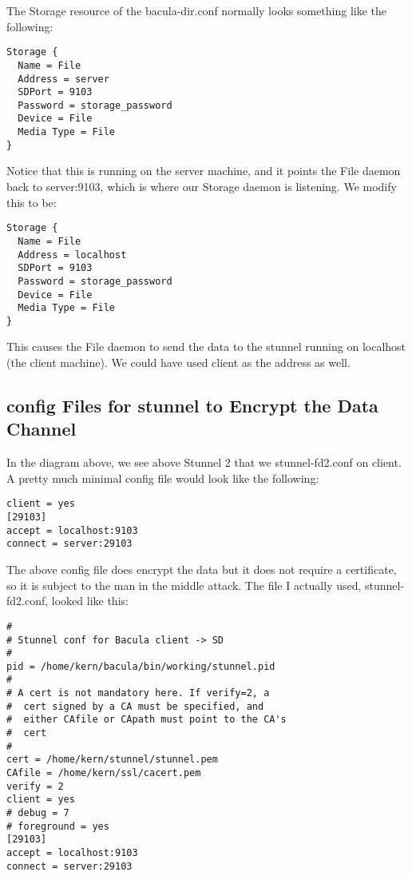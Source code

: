 The Storage resource of the bacula-dir.conf normally looks something like the
following: 

\footnotesize
\begin{verbatim}
Storage {
  Name = File
  Address = server
  SDPort = 9103
  Password = storage_password
  Device = File
  Media Type = File
}
\end{verbatim}
\normalsize

Notice that this is running on the server machine, and it points the File
daemon back to server:9103, which is where our Storage daemon is listening. We
modify this to be: 

\footnotesize
\begin{verbatim}
Storage {
  Name = File
  Address = localhost
  SDPort = 9103
  Password = storage_password
  Device = File
  Media Type = File
}
\end{verbatim}
\normalsize

This causes the File daemon to send the data to the stunnel running on
localhost (the client machine). We could have used client as the address as
well. 

\subsection*{config Files for stunnel to Encrypt the Data Channel}

In the diagram above, we see above Stunnel 2 that we stunnel-fd2.conf on
client. A pretty much minimal config file would look like the following: 

\footnotesize
\begin{verbatim}
client = yes
[29103]
accept = localhost:9103
connect = server:29103
\end{verbatim}
\normalsize

The above config file does encrypt the data but it does not require a
certificate, so it is subject to the man in the middle attack. The file I
actually used, stunnel-fd2.conf, looked like this: 

\footnotesize
\begin{verbatim}
#
# Stunnel conf for Bacula client -> SD
#
pid = /home/kern/bacula/bin/working/stunnel.pid
#
# A cert is not mandatory here. If verify=2, a
#  cert signed by a CA must be specified, and
#  either CAfile or CApath must point to the CA's
#  cert
#
cert = /home/kern/stunnel/stunnel.pem
CAfile = /home/kern/ssl/cacert.pem
verify = 2
client = yes
# debug = 7
# foreground = yes
[29103]
accept = localhost:9103
connect = server:29103
\end{verbatim}
\normalsize

